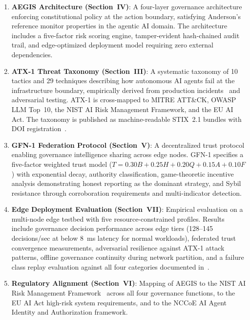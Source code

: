 \documentclass[journal]{IEEEtran}
\begin{document}
\begin{enumerate}
\item \textbf{AEGIS Architecture (Section~IV)}: A four-layer governance architecture enforcing constitutional policy at the action boundary, satisfying Anderson's reference monitor properties in the agentic AI domain. The architecture includes a five-factor risk scoring engine, tamper-evident hash-chained audit trail, and edge-optimized deployment model requiring zero external dependencies.

\item \textbf{ATX-1 Threat Taxonomy (Section~III)}: A systematic taxonomy of 10 tactics and 29 techniques describing how autonomous AI agents fail at the infrastructure boundary, empirically derived from production incidents~\cite{shapira2026} and adversarial testing. ATX-1 is cross-mapped to MITRE ATT\&CK, OWASP LLM Top~10, the NIST AI Risk Management Framework, and the EU AI Act. The taxonomy is published as machine-readable STIX~2.1 bundles with DOI registration~\cite{atx1_dataset}.

\item \textbf{GFN-1 Federation Protocol (Section~V)}: A decentralized trust protocol enabling governance intelligence sharing across edge nodes. GFN-1 specifies a five-factor weighted trust model ($T = 0.30B + 0.25H + 0.20Q + 0.15A + 0.10F$) with exponential decay, authority classification, game-theoretic incentive analysis demonstrating honest reporting as the dominant strategy, and Sybil resistance through corroboration requirements and multi-indicator detection.

\item \textbf{Edge Deployment Evaluation (Section~VII)}: Empirical evaluation on a multi-node edge testbed with five resource-constrained profiles. Results include governance decision performance across edge tiers (128--145 decisions/sec at below 8~ms latency for normal workloads), federated trust convergence measurements, adversarial resilience against ATX-1 attack patterns, offline governance continuity during network partition, and a failure class replay evaluation against all four categories documented in~\cite{shapira2026}.

\item \textbf{Regulatory Alignment (Section~VI)}: Mapping of AEGIS to the NIST AI Risk Management Framework~\cite{nist_airmf} across all four governance functions, to the EU AI Act high-risk system requirements, and to the NCCoE AI Agent Identity and Authorization framework.
\end{enumerate}
\end{document}
